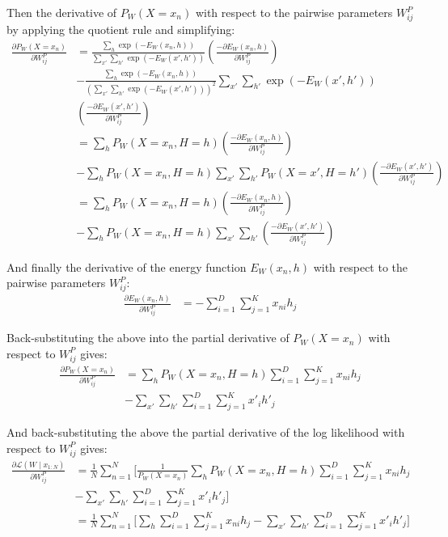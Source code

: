 \documentclass[12pt]{article}
\begin{document}
\begin{enumerate}
\begin{enumerate}
Then the derivative of $P_W(X=x_n)$ with respect to the pairwise parameters $W^P_{ij}$ by applying the quotient rule and simplifying:
\begin{align*}
\frac{\partial P_W(X=x_n)}{\partial W^P_{ij}} &= \frac{\sum_{h}\exp\left(-E_W(x_n,h)\right)}{\sum_{x'}\sum_{h'}\exp\left(-E_W(x', h')\right)}\left(\frac{-\partial E_W(x_n,h)}{\partial W^P_{ij}}\right)\\
&- \frac{\sum_{h}\exp\left(-E_W(x_n,h)\right)}{\left(\sum_{x'}\sum_{h'}\exp\left(-E_W(x', h')\right)\right)^2}\sum_{x'}\sum_{h'}\exp\left(-E_W(x', h')\right)\\
&\left(\frac{-\partial E_W(x',h')}{\partial W^P_{ij}}\right)\\
&= \sum_{h}P_W(X=x_n,H=h)\left(\frac{-\partial E_W(x_n,h)}{\partial W^P_{ij}}\right)\\
&- \sum_{h}P_W(X=x_n,H=h)\sum_{x'}\sum_{h'}P_W(X=x',H=h')\left(\frac{-\partial E_W(x',h')}{\partial W^P_{ij}}\right)\\
&= \sum_{h}P_W(X=x_n,H=h)\left(\frac{-\partial E_W(x_n,h)}{\partial W^P_{ij}}\right)\\
&- \sum_{h}P_W(X=x_n,H=h)\sum_{x'}\sum_{h'}\left(\frac{-\partial E_W(x',h')}{\partial W^P_{ij}}\right)
\end{align*}

And finally the derivative of the energy function $E_W(x_n,h)$ with respect to the pairwise parameters $W^P_{ij}$:
\begin{align*}
\frac{\partial E_W(x_n,h)}{\partial W^P_{ij}} &= -\sum_{i=1}^D\sum_{j=1}^Kx_{ni}h_{j}
\end{align*}

Back-substituting the above into the partial derivative of $P_W(X=x_n)$ with respect to $W^P_{ij}$ gives:
\begin{align*}
\frac{\partial P_W(X=x_n)}{\partial W^P_{ij}} &= \sum_{h}P_W(X=x_n,H=h)\sum_{i=1}^D\sum_{j=1}^Kx_{ni}h_{j}\\
&- \sum_{x'}\sum_{h'}\sum_{i=1}^D\sum_{j=1}^Kx'_{i}h'_{j}
\end{align*}

And back-substituting the above the partial derivative of the log likelihood with respect to $W^P_{ij}$ gives:
\begin{align*}
\frac{\partial\mathcal{L}(W\mid x_{1:N})}{\partial W^P_{ij}} &= \frac{1}{N}\sum_{n=1}^N\Bigg[\frac{1}{P_W(X=x_n)}\sum_{h}P_W(X=x_n,H=h)\sum_{i=1}^D\sum_{j=1}^Kx_{ni}h_{j}\\
&- \sum_{x'}\sum_{h'}\sum_{i=1}^D\sum_{j=1}^Kx'_{i}h'_{j}\Bigg]\\
&= \frac{1}{N}\sum_{n=1}^N\Bigg[\sum_h\sum_{i=1}^D\sum_{j=1}^Kx_{ni}h_{j} - \sum_{x'}\sum_{h'}\sum_{i=1}^D\sum_{j=1}^Kx'_{i}h'_{j}\Bigg]
\end{align*}


\end{enumerate}
\end{enumerate}
\end{document}
